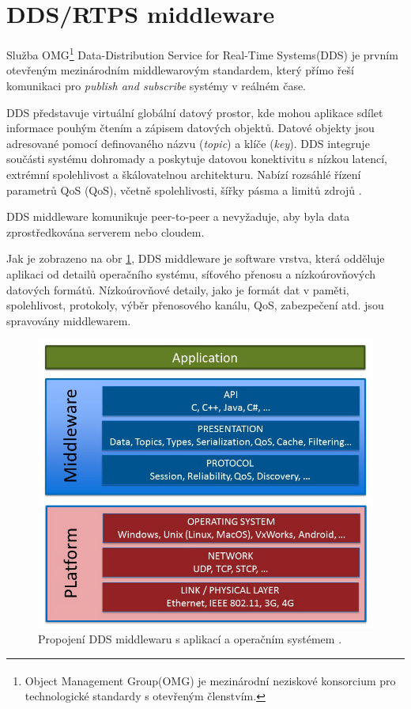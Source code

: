 \section{DDS/RTPS middleware}

Služba OMG\footnote{Object Management Group\textsuperscript \textregistered (OMG\textsuperscript \textregistered) je mezinárodní neziskové konsorcium pro technologické standardy s otevřeným členstvím.} Data-Distribution Service for Real-Time Systems\textsuperscript \textregistered (\acs{DDS}) je prvním otevřeným mezinárodním middlewarovým standardem, který přímo řeší komunikaci pro \textit{publish and subscribe} systémy v reálném čase.

\acs{DDS} představuje virtuální globální datový prostor, kde mohou aplikace sdílet informace pouhým čtením a zápisem datových objektů. Datové objekty jsou adresované pomocí definovaného názvu (\textit{topic}) a klíče (\textit{key}). \acs{DDS} integruje součásti systému dohromady a poskytuje datovou konektivitu s nízkou latencí, extrémní spolehlivost a škálovatelnou architekturu. Nabízí rozsáhlé řízení parametrů \acs{QoS} (\acl{QoS}), včetně spolehlivosti, šířky pásma a limitů zdrojů \cite{DDS_Def}. 

\acs{DDS} middleware komunikuje peer-to-peer a nevyžaduje, aby byla data zprostředkována serverem nebo cloudem. 

Jak je zobrazeno na obr \ref{fig:DDSmiddleware}, \acs{DDS} middleware je software vrstva, která odděluje aplikaci od detailů operačního systému, síťového přenosu a nízkoúrovňových datových formátů. Nízkoúrovňové detaily, jako je formát dat v paměti, spolehlivost, protokoly, výběr přenosového kanálu, \acs{QoS}, zabezpečení atd. jsou spravovány middlewarem. 

\begin{figure}[!ht]
    \begin{center}
        \includegraphics[scale=0.4]{obrazky/DDS1}
    \end{center}
    \caption[Propojení \acs{DDS} middlewaru s aplikací a operačním systémem]{Propojení \acs{DDS} middlewaru s aplikací a operačním systémem \cite{DDS_Main}.}
    \label{fig:DDSmiddleware}
\end{figure}

